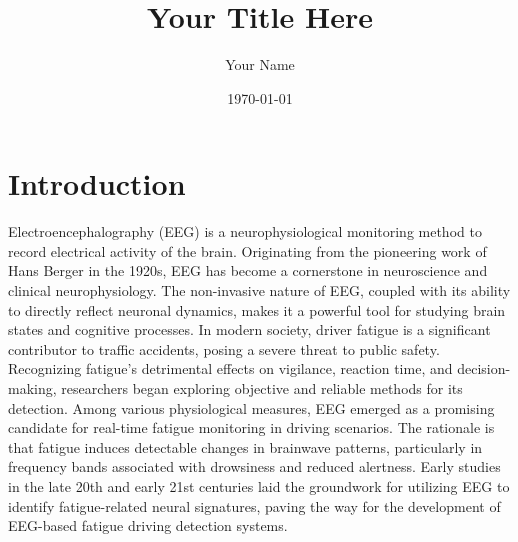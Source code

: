 \documentclass{article}
\title{Your Title Here}
\author{Your Name}
\date{\today}
\begin{document}
\maketitle

\section{Introduction}
Electroencephalography (EEG) is a neurophysiological monitoring method to record electrical activity of the brain. Originating from the pioneering work of Hans Berger in the 1920s, EEG has become a cornerstone in neuroscience and clinical neurophysiology.  The non-invasive nature of EEG, coupled with its ability to directly reflect neuronal dynamics, makes it a powerful tool for studying brain states and cognitive processes.  In modern society, driver fatigue is a significant contributor to traffic accidents, posing a severe threat to public safety.  Recognizing fatigue's detrimental effects on vigilance, reaction time, and decision-making, researchers began exploring objective and reliable methods for its detection.  Among various physiological measures, EEG emerged as a promising candidate for real-time fatigue monitoring in driving scenarios. The rationale is that fatigue induces detectable changes in brainwave patterns, particularly in frequency bands associated with drowsiness and reduced alertness.  Early studies in the late 20th and early 21st centuries laid the groundwork for utilizing EEG to identify fatigue-related neural signatures, paving the way for the development of EEG-based fatigue driving detection systems.
\end{document}
